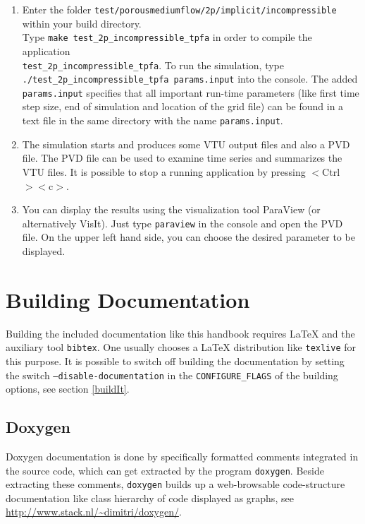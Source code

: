 \begin{enumerate}
\item Enter the folder \texttt{test/porousmediumflow/2p/implicit/incompressible} within your build directory.\\ Type \texttt{make test{\_}2p{\_}incompressible{\_}tpfa}
      in order to compile the application\\\texttt{test{\_}2p{\_}incompressible{\_}tpfa}. To run the simulation,
      type \texttt{./test{\_}2p{\_}incompressible{\_}tpfa params.input}
      into the console.
      The added \texttt{params.input} specifies that all
      important run-time parameters (like first time step size, end of simulation and location
      of the grid file) can be found in a text file in the same directory  with the
      name \texttt{params.input}.
\item The simulation starts and produces some VTU output files and also a PVD
      file. The PVD file can be used to examine time series and summarizes the VTU
      files. It is possible to stop a running application by pressing $<$Ctrl$><$c$>$.
\item You can display the results using the visualization tool ParaView (or
      alternatively VisIt). Just type \texttt{paraview} in the console and open the
      PVD file. On the upper left hand side, you can choose the desired parameter to be displayed.
\end{enumerate}

\section{Building Documentation}
\label{sec:build-doc}
Building the included documentation like this handbook requires \LaTeX{} and the auxiliary tool
\texttt{bibtex}. One usually chooses a \LaTeX{} distribution like \texttt{texlive} for this purpose.
It is possible to switch off building the documentation by setting the switch \texttt{--disable-documentation}
in the \texttt{CONFIGURE\_FLAGS} of the building options, see section \ref{buildIt}.

\subsection{Doxygen}
\label{sec:build-doxy-doc}
Doxygen documentation is done by specifically formatted comments integrated in the source code,
which can get extracted by the program \texttt{doxygen}. Beside extracting these comments,
\texttt{doxygen} builds up a web-browsable code-structure documentation
like class hierarchy of code displayed as graphs, see \url{http://www.stack.nl/~dimitri/doxygen/}.

